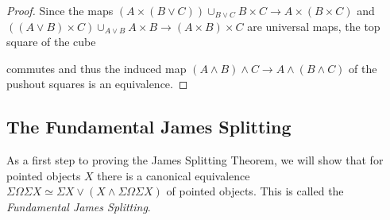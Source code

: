 \begin{lemma}
\begin{proof}
        Since the maps $\left(A\times(B\vee C)\right)\cup_{B\vee C} B\times C\to A\times (B\times C)$ and $\left((A\vee B)\times C\right)\cup_{A\vee B} A\times B\to (A\times B)\times C$ are universal maps, the top square of the cube
        \begin{center}
        \end{center}
        commutes and thus the induced map $(A\wedge B)\wedge C\to A\wedge(B\wedge C)$ of the pushout squares is an equivalence.
    \end{proof}
\end{lemma}
\subsection*{The Fundamental James Splitting}
As a first step to proving the James Splitting Theorem, we will show that for pointed objects $X$ there is a canonical equivalence $\Sigma\Omega\Sigma X\simeq\Sigma X\vee\left(X\wedge\Sigma\Omega\Sigma X\right)$ of pointed objects.
This is called the \emph{Fundamental James Splitting}.

